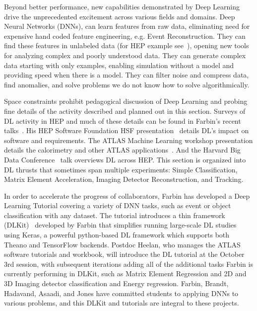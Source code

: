 \label{sec:af_deeplearning}
Beyond better performance, new capabilities demonstrated by Deep
Learning drive the unprecedented excitement across various fields and
domains. Deep Neural Networks (DNNs), can learn features from raw
data, eliminating need for expensive hand coded feature engineering,
e.g. Event Reconstruction. They can find these features in unlabeled
data (for HEP example see~\cite{}), opening new tools for analyzing
complex and poorly understood data. They can generate complex data
starting with only examples, enabling simulation without a model and
providing speed when there is a model. They can filter noise and
compress data, find anomalies, and solve problems we do not know how
to solve algorithmically.

Space constraints prohibit pedagogical discussion of Deep Learning and
probing fine details of the activity described and planned out in this
section. Surveys of DL activity in HEP and much of these details can
be found in Farbin's recent talks~\cite{}. His HEP Software Foundation
HSF presentation~\cite{} details DL's impact on software and
requirements. The ATLAS Machine Learning workshop presentation details
the calorimetry and other ATLAS applications~\cite{}. And the Harvard
Big Data Conference~\cite{} talk overviews DL across HEP. This section
is organized into DL thrusts that sometimes span multiple experiments:
Simple Classification, Matrix Element Acceleration, Imaging Detector
Reconstruction, and Tracking.

In order to accelerate the progress of collaborators, Farbin has
developed a Deep Learning Tutorial covering a variety of DNN tasks,
such as event or object classification with any dataset.  The tutorial
introduces a thin framework (DLKit)~\cite{} developed by Farbin that
simplifies running large-scale DL studies using Keras, a powerful
python-based DL framework which supports both Theano and TensorFlow
backends. Postdoc Heelan, who manages the ATLAS software tutorials
and workbook, will introduce the DL tutorial at the October 3rd
session, with subsequent iterations adding all of the additional tasks
Farbin is currently performing in DLKit, such as Matrix Element
Regression and 2D and 3D Imaging detector classification and Energy
regression. Farbin, Brandt, Hadavand, Asaadi, and Jones have committed
students to applying DNNs to various problems, and this DLKit and
tutorials are integral to these projects.

